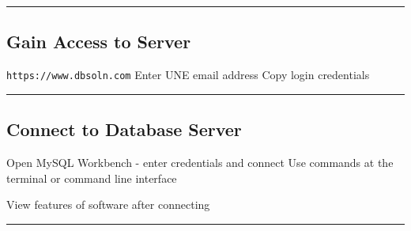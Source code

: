 \documentclass{article}
\begin{document}
 \hspace{-0.5cm}\rule[-0.101in]{\textwidth}{0.0025in}








\subsection*{Gain Access to Server}
\begin{outline}
 \1 \texttt{https://www.dbsoln.com}
 \1 Enter UNE email address
 \1 Copy login credentials
\end{outline} 
 \hspace{-0.5cm}\rule[-0.101in]{\textwidth}{0.0025in}









\subsection*{Connect to Database Server}
\begin{outline}

 \1 Open MySQL Workbench - enter credentials and connect
    \2 Use commands at the terminal or command line interface
    
 \1 View features of software after connecting
\end{outline} 

 \hspace{-0.5cm}\rule[-0.101in]{\textwidth}{0.0025in}









\end{document}
